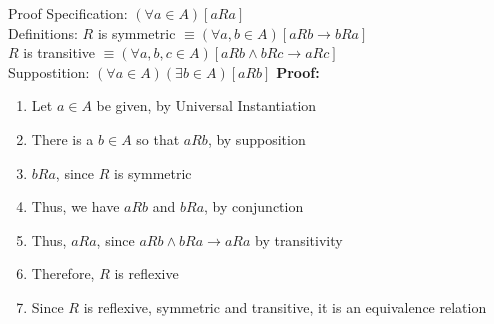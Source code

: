 \begin{Solution}{10.8}
Proof Specification: $(\forall a\in A)[aRa]$ \\
Definitions: $R$ is symmetric $\equiv (\forall a,b\in A)[aRb \rightarrow bRa]$ \\
 $R$ is transitive $\equiv (\forall a,b,c \in A)[aRb \land bRc \rightarrow aRc]$ \\
Suppostition: $(\forall a\in A)(\exists b\in A)[aRb]$ \newline
\textbf{Proof:}
\begin{enumerate}[noitemsep, label=$\blacktriangleright$]
    \item Let $a\in A$ be given, by Universal Instantiation
   \item There is a $b\in A$ so that $aRb$, by supposition
   \item $bRa$, since $R$ is symmetric
   \item Thus, we have $aRb$ and $bRa$, by conjunction
   \item Thus, $aRa$, since $aRb \land bRa \rightarrow aRa$ by transitivity
   \item Therefore, $R$ is reflexive
   \item Since $R$ is reflexive, symmetric and transitive, it is an equivalence relation
\end{enumerate}


\end{Solution}
